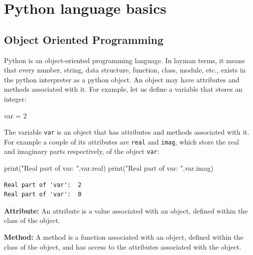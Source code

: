 \documentclass[
  letterpaper,
  DIV=11,
  numbers=noendperiod]{scrreprt}
\newenvironment{Shaded}{\begin{snugshade}}{\end{snugshade}}
\newcommand{\BuiltInTok}[1]{\textcolor[rgb]{0.00,0.23,0.31}{#1}}
\newcommand{\DecValTok}[1]{\textcolor[rgb]{0.68,0.00,0.00}{#1}}
\newcommand{\NormalTok}[1]{\textcolor[rgb]{0.00,0.23,0.31}{#1}}
\newcommand{\OperatorTok}[1]{\textcolor[rgb]{0.37,0.37,0.37}{#1}}
\newcommand{\StringTok}[1]{\textcolor[rgb]{0.13,0.47,0.30}{#1}}
\begin{document}
\hypertarget{python-language-basics}{%
\section{Python language basics}\label{python-language-basics}}

\hypertarget{object-oriented-programming}{%
\subsection{Object Oriented
Programming}\label{object-oriented-programming}}

Python is an object-oriented programming language. In layman terms, it
means that every number, string, data structure, function, class,
module, etc., exists in the python interpreter as a python object. An
object may have attributes and methods associated with it. For example,
let us define a variable that stores an integer:

\begin{Shaded}
\begin{Highlighting}[]
\NormalTok{var }\OperatorTok{=} \DecValTok{2}
\end{Highlighting}
\end{Shaded}

The variable \texttt{var} is an object that has attributes and methods
associated with it. For example a couple of its attributes are
\texttt{real} and \texttt{imag}, which store the real and imaginary
parts respectively, of the object \texttt{var}:

\begin{Shaded}
\begin{Highlighting}[]
\BuiltInTok{print}\NormalTok{(}\StringTok{"Real part of \textquotesingle{}var\textquotesingle{}: "}\NormalTok{,var.real)}
\BuiltInTok{print}\NormalTok{(}\StringTok{"Real part of \textquotesingle{}var\textquotesingle{}: "}\NormalTok{,var.imag)}
\end{Highlighting}
\end{Shaded}

\begin{verbatim}
Real part of 'var':  2
Real part of 'var':  0
\end{verbatim}

\textbf{Attribute:} An attribute is a value associated with an object,
defined within the class of the object.

\textbf{Method:} A method is a function associated with an object,
defined within the class of the object, and has access to the attributes
associated with the object.
\end{document}
